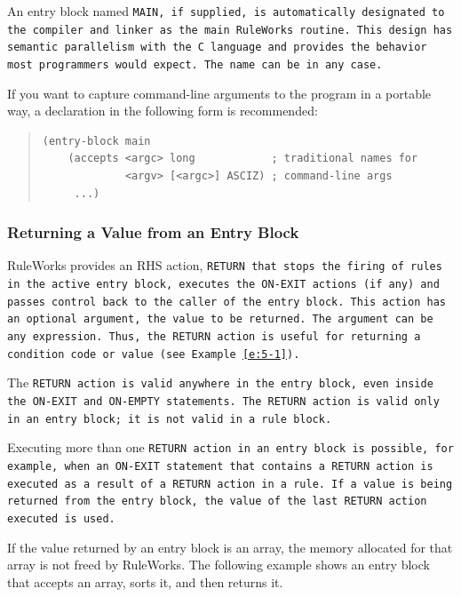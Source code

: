 An entry block named \tt{MAIN}, if supplied, is automatically
designated to the compiler and linker as the main RuleWorks
routine. This design has semantic parallelism with the C language and
provides the behavior most programmers would expect. The name can be
in any case.

If you want to capture command-line arguments to the program in a
portable way, a declaration in the following form is recommended:
\begin{quote}
\begin{verbatim}
(entry-block main
    (accepts <argc> long            ; traditional names for
             <argv> [<argc>] ASCIZ) ; command-line args
     ...)
\end{verbatim}
\end{quote}

\subsubsection{Returning a Value from an Entry Block}

RuleWorks provides an RHS action, \tt{RETURN} that stops the firing of
rules in the active entry block, executes the \tt{ON-EXIT} actions (if
any) and passes control back to the caller of the entry block. This
action has an optional argument, the value to be returned. The
argument can be any expression. Thus, the \tt{RETURN} action is useful
for returning a condition code or value (see Example~\ref{e:5-1}).

The \tt{RETURN} action is valid anywhere in the entry block, even
inside the \tt{ON-EXIT} and \tt{ON-EMPTY} statements. The \tt{RETURN}
action is valid only in an entry block; it is not valid in a rule
block.

Executing more than one \tt{RETURN} action in an entry block is
possible, for example, when an \tt{ON-EXIT} statement that contains a
\tt{RETURN} action is executed as a result of a \tt{RETURN} action in
a rule. If a value is being returned from the entry block, the value
of the last \tt{RETURN} action executed is used.

If the value returned by an entry block is an array, the memory
allocated for that array is not freed by RuleWorks. The following
example shows an entry block that accepts an array, sorts it, and then
returns it.

